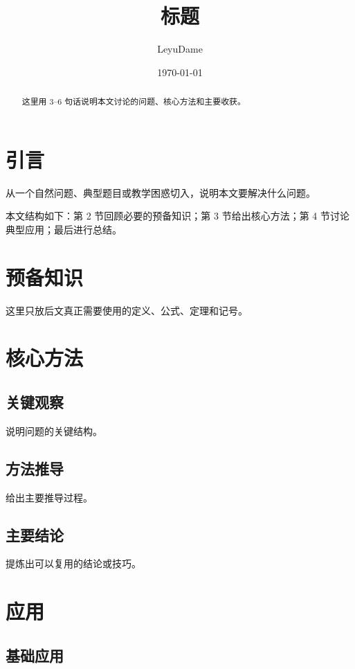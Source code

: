 \documentclass[10pt,a4paper,fontset=none]{ctexart}
\title{标题}
\author{LeyuDame}
\date{\today}
\begin{document}
\maketitle

\begin{abstract}
这里用 3--6 句话说明本文讨论的问题、核心方法和主要收获。
\end{abstract}

\section{引言}

从一个自然问题、典型题目或教学困惑切入，说明本文要解决什么问题。

本文结构如下：第 2 节回顾必要的预备知识；第 3 节给出核心方法；第 4 节讨论典型应用；最后进行总结。

\section{预备知识}

这里只放后文真正需要使用的定义、公式、定理和记号。

\section{核心方法}

\subsection{关键观察}

说明问题的关键结构。

\subsection{方法推导}

给出主要推导过程。

\subsection{主要结论}

提炼出可以复用的结论或技巧。

\section{应用}

\subsection{基础应用}
\end{document}
